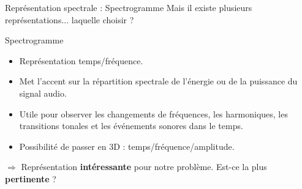\documentclass[compress,xcolor=table]{beamer}
\begin{document}
\begin{frame}{Représentation spectrale : Spectrogramme}
    Mais il existe plusieurs représentations... laquelle choisir ?

    \begin{block}{Spectrogramme}

        \begin{itemize}
            \item Représentation temps/fréquence.
            \item Met l'accent sur la répartition spectrale de l'énergie ou de la puissance du signal audio.
            \item Utile pour observer les changements de fréquences, les harmoniques, les transitions tonales et les événements sonores dans le temps.
            \item Possibilité de passer en 3D : temps/fréquence/amplitude.
        \end{itemize}

    \end{block}

    $\Rightarrow$ Représentation \textbf{intéressante} pour notre problème. Est-ce la plus \textbf{pertinente} ?

\end{frame}
\end{document}
